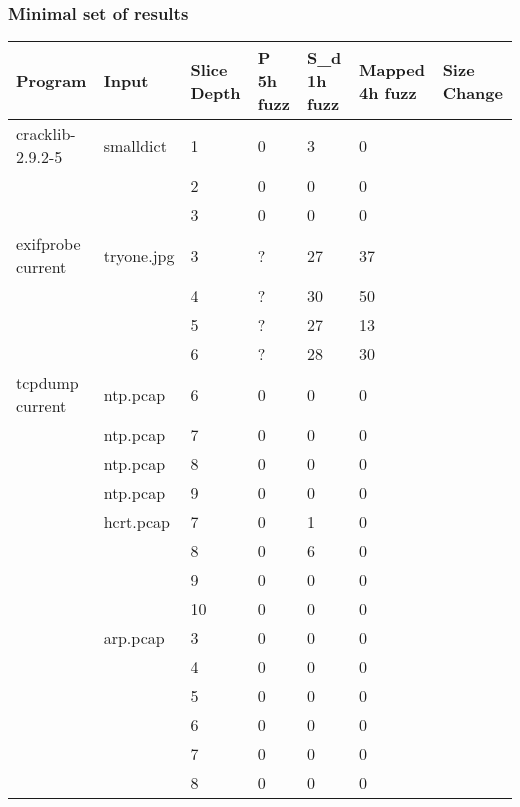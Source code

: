 \documentclass{beamer}
\begin{document}
\frame
{
	\frametitle{Minimal set of results}
	\tiny

	
	\begin{center}
	\begin{tabular}{|l | l | l  | l | l | l| l |}
	\hline
	Program          & Input      & Slice Depth  & P 5h fuzz &  S\_d 1h fuzz & Mapped 4h fuzz & Size Change\\ \hline
	cracklib-2.9.2-5 & smalldict   & 1 & 0 & 3 & 0 & \\ \hline
	                 &             & 2 & 0 & 0 & 0 & \\ \hline
	                 &             & 3 & 0 & 0 & 0 & \\ \hline
	exifprobe current & tryone.jpg & 3 & ? & 27 & 37 & \\ \hline
	                  &            & 4 & ? & 30 & 50 & \\ \hline
	                  &            & 5 & ? & 27 & 13 & \\ \hline
	                  &            & 6 & ? & 28 & 30 & \\ \hline
	tcpdump current   & ntp.pcap   & 6 & 0 & 0 & 0  & \\ \hline
	                  & ntp.pcap   & 7 & 0 & 0 & 0  & \\ \hline
	                  & ntp.pcap   & 8 & 0 & 0 & 0  & \\ \hline
	                  & ntp.pcap   & 9 & 0 & 0 & 0  & \\ \hline
                      & hcrt.pcap  & 7 & 0 & 1 & 0  & \\ \hline
                      &            & 8 & 0 & 6 & 0  & \\ \hline
                      &            & 9 & 0 & 0 & 0  & \\ \hline
                      &            & 10 & 0 & 0 & 0 & \\ \hline
                      & arp.pcap   & 3 & 0 & 0 & 0 & \\ \hline
                      &    & 4 & 0 & 0 & 0 & \\ \hline                      
                      &    & 5 & 0 & 0 & 0 & \\ \hline
                      &    & 6 & 0 & 0 & 0 & \\ \hline
                      &    & 7 & 0 & 0 & 0 & \\ \hline
                      &    & 8 & 0 & 0 & 0 & \\ \hline                                                                  
	\end{tabular}
	\end{center}

}
\end{document}
